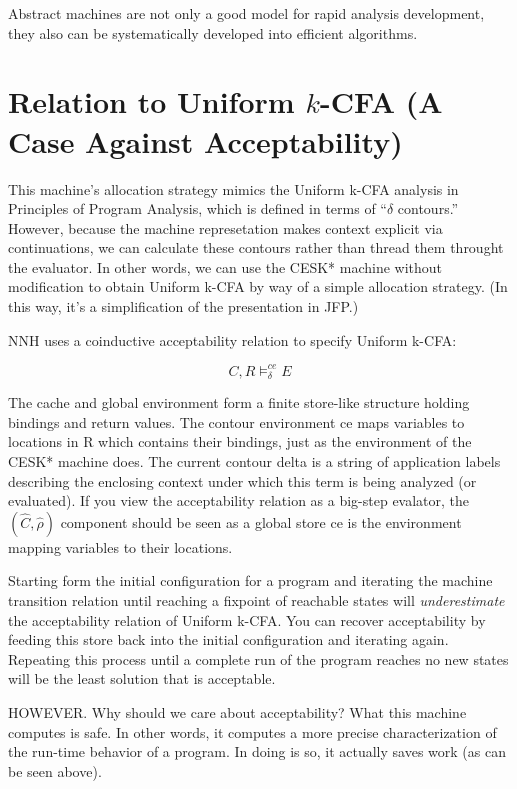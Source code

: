 \documentclass[preprint,onecolumn,9pt]{sigplanconf} %
\begin{document}
Abstract machines are not only a good model for rapid analysis
development, they also can be systematically developed into efficient
algorithms.




\appendix
\section{Relation to Uniform \(k\)-CFA (A Case Against Acceptability)}

\cite{dvanhorn:nielson-nielson-popl97} \cite{dvanhorn:Neilson:1999}

This machine's allocation strategy mimics the Uniform k-CFA analysis
in Principles of Program Analysis, which is defined in terms of
``$\delta$ contours.''  However, because the machine represetation makes
context explicit via continuations, we can calculate these contours
rather than thread them throught the evaluator.  In other words, we
can use the CESK* machine without modification to obtain Uniform k-CFA
by way of a simple allocation strategy.  (In this way, it's a
simplification of the presentation in JFP.)

NNH uses a coinductive acceptability relation to specify Uniform
k-CFA:

\[
   C,R \models^{ce}_\delta E
\]

The cache and global environment form a finite store-like structure
holding bindings and return values.  The contour environment ce maps
variables to locations in R which contains their bindings, just as the
environment of the CESK* machine does.  The current contour delta is a
string of application labels describing the enclosing context under
which this term is being analyzed (or evaluated).  If you view the
acceptability relation as a big-step evalator, the
$(\widehat C,\widehat\rho)$ component should be seen as a global
store ce is the environment mapping variables to their locations.

Starting form the initial configuration for a program and iterating
the machine transition relation until reaching a fixpoint of reachable
states will \emph{underestimate} the acceptability relation of Uniform
k-CFA.  You can recover acceptability by feeding this store back into
the initial configuration and iterating again.  Repeating this process
until a complete run of the program reaches no new states will be the
least solution that is acceptable.

HOWEVER.  Why should we care about acceptability?  What this
machine computes is safe.  In other words, it computes a more
precise characterization of the run-time behavior of a program.  In
doing is so, it actually saves work (as can be seen above).
\end{document}
